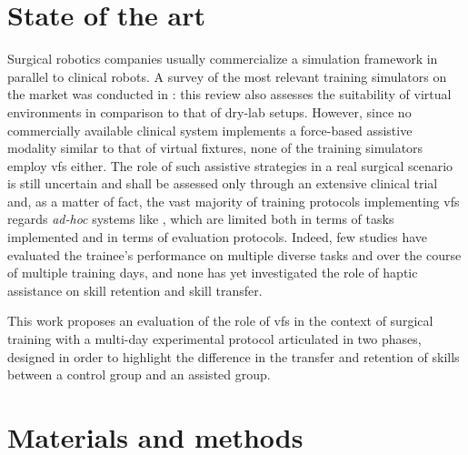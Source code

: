 \documentclass{article}
\begin{document}
\begin{multicols}{2}
\section{State of the art}
Surgical robotics companies usually commercialize a simulation framework in parallel to clinical robots. A survey of the most relevant training simulators on the market was conducted in \cite{Bric2016}: this review also assesses the suitability of virtual environments in comparison to that of dry-lab setups. However, since no commercially available clinical system implements a force-based assistive modality similar to that of virtual fixtures, none of the training simulators employ \acp{vf} either. The role of such assistive strategies in a real surgical scenario is still uncertain and shall be assessed only through an extensive clinical trial and, as a matter of fact, the vast majority of training protocols implementing \acp{vf} regards \textit{ad-hoc} systems like \cite{Lin2014}, which are limited both in terms of tasks implemented and in terms of evaluation protocols. Indeed, few studies \cite{Enayati2018} have evaluated the trainee's performance on multiple diverse tasks and over the course of multiple training days, and none has yet investigated the role of haptic assistance on skill retention and skill transfer. 

This work proposes an evaluation of the role of \acp{vf} in the context of surgical training with a multi-day experimental protocol articulated in two phases, designed in order to highlight the difference in the transfer and retention of skills between a control group and an assisted group. 
\section{Materials and methods}

\end{multicols}
\end{document}
